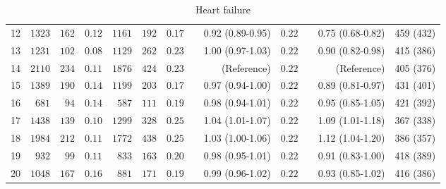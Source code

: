 \documentclass[]{article}\usepackage[]{graphicx}\usepackage[]{color}
\begin{document}
\begin{landscape}
\begin{table}[!tbp]
\begin{center}
\begin{tabular}{lrrrrrrcrrcrr}
12&$1323$&$162$&$0.12$&$1161$&$192$&$0.17$&&0.92 (0.89-0.95)&$0.22$&&0.75 (0.68-0.82)&459 (432)\tabularnewline
13&$1231$&$102$&$0.08$&$1129$&$262$&$0.23$&&1.00 (0.97-1.03)&$0.22$&&0.90 (0.82-0.98)&415 (386)\tabularnewline
14&$2110$&$234$&$0.11$&$1876$&$424$&$0.23$&&(Reference)&$0.22$&&(Reference)&405 (376)\tabularnewline
15&$1389$&$190$&$0.14$&$1199$&$203$&$0.17$&&0.97 (0.94-1.00)&$0.22$&&0.89 (0.81-0.97)&431 (401)\tabularnewline
16&$ 681$&$ 94$&$0.14$&$ 587$&$111$&$0.19$&&0.98 (0.94-1.01)&$0.22$&&0.95 (0.85-1.05)&421 (392)\tabularnewline
17&$1438$&$139$&$0.10$&$1299$&$328$&$0.25$&&1.04 (1.01-1.07)&$0.22$&&1.09 (1.01-1.18)&367 (338)\tabularnewline
18&$1984$&$212$&$0.11$&$1772$&$438$&$0.25$&&1.03 (1.00-1.06)&$0.22$&&1.12 (1.04-1.20)&386 (357)\tabularnewline
19&$ 932$&$ 99$&$0.11$&$ 833$&$163$&$0.20$&&0.98 (0.95-1.01)&$0.22$&&0.91 (0.83-1.00)&418 (389)\tabularnewline
20&$1048$&$167$&$0.16$&$ 881$&$171$&$0.19$&&0.99 (0.96-1.02)&$0.22$&&0.93 (0.85-1.02)&416 (386)\tabularnewline
\hline
\end{tabular}

\caption{Heart failure\label{heart_failure_table}}\end{center}


\end{table}
\end{landscape}
\end{document}
